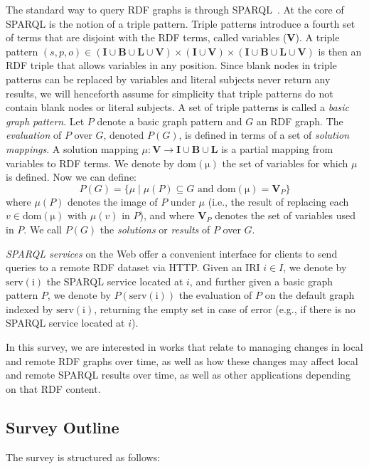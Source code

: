 \documentclass[sw]{iosart2x}
\newcommand{\I}{\ensuremath{\mathbf{I}}}
\newcommand{\B}{\ensuremath{\mathbf{B}}}
\renewcommand{\L}{\ensuremath{\mathbf{L}}}
\newcommand{\V}{\ensuremath{\mathbf{V}}}
\newcommand{\dom}[1]{\ensuremath{\mathrm{dom(#1)}}}
\newcommand{\serv}[1]{\ensuremath{\mathrm{serv(#1)}}}
\begin{document}
The standard way to query RDF graphs is through SPARQL~\cite{sparql11}. At the core of SPARQL is the notion of a triple pattern. Triple patterns introduce a fourth set of terms that are disjoint with the RDF terms, called variables ($\V$). A triple pattern $(s,p,o) \in (\I \cup \B \cup \L \cup \V) \times (\I \cup \V) \times (\I \cup \B \cup \L \cup \V)$ is then an RDF triple that allows variables in any position. Since blank nodes in triple patterns can be replaced by variables and literal subjects never return any results, we will henceforth assume for simplicity that triple patterns do not contain blank nodes or literal subjects. %
A set of triple patterns is called a \emph{basic graph pattern}. Let $P$ denote a basic graph pattern and $G$ an RDF graph. The \emph{evaluation} of $P$ over $G$, denoted $P(G)$, is defined in terms of a set of \emph{solution mappings}. A solution mapping $\mu : \V \rightarrow \I \cup \B \cup \L$ is a partial mapping from variables to RDF terms. We denote by $\dom{\mu}$ the set of variables for which $\mu$ is defined. Now we can define:
%
\[ P(G) = \{ \mu \mid \mu(P) \subseteq G\text{ and }\dom{\mu} = \V_P \} \]
%
\noindent where $\mu(P)$ denotes the image of $P$ under $\mu$ (i.e., the result of replacing each $v \in \dom{\mu}$ with $\mu(v)$ in $P$), and where $\V_P$ denotes the set of variables used in $P$. We call $P(G)$ the \emph{solutions} or \emph{results} of $P$ over $G$.

\emph{SPARQL services} on the Web offer a convenient interface for clients to send queries to a remote RDF dataset via HTTP. Given an IRI $i \in I$, we denote by $\serv{i}$ the SPARQL service located at $i$, and further given a basic graph pattern $P$, we denote by $P(\serv{i})$ the evaluation of $P$ on the default graph indexed by $\serv{i}$, returning the empty set in case of error (e.g., if there is no SPARQL service located at $i$).

In this survey, we are interested in works that relate to managing changes in local and remote RDF graphs over time, as well as how these changes may affect local and remote SPARQL results over time, as well as other applications depending on that RDF content.

\subsection{Survey Outline}\label{Outline}

The survey is structured as follows:
\end{document}
